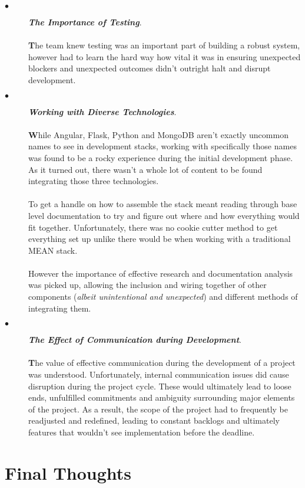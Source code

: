 \begin{description}
  \item[$\bullet$] \textit{\textbf{The Importance of Testing}}.
  
  \paragraph{}
  \textbf{T}he team knew testing was an important part of building a robust system, however had to learn the hard way how vital it was in ensuring unexpected blockers and unexpected outcomes didn't outright halt and disrupt development.
  
  \item[$\bullet$] \textit{\textbf{Working with Diverse Technologies}}.
  
  \paragraph{}
  \textbf{W}hile Angular, Flask, Python and MongoDB aren't exactly uncommon names to see in development stacks, working with specifically those names was found to be a rocky experience during the initial development phase. As it turned out, there wasn't a whole lot of content to be found integrating those three technologies.
  
  \paragraph{}
  To get a handle on how to assemble the stack meant reading through base level documentation to try and figure out where and how everything would fit together. Unfortunately, there was no cookie cutter method to get everything set up unlike there would be when working with a traditional MEAN stack. 
  
  \paragraph{}
  However the importance of effective research and documentation analysis was picked up, allowing the inclusion and wiring together of other components (\textit{albeit unintentional and unexpected}) and different methods of integrating them.

  \item[$\bullet$] \textit{\textbf{The Effect of Communication during Development}}.
  
  \paragraph{}
  \textbf{T}he value of effective communication during the development of a project was understood. Unfortunately, internal communication issues did cause disruption during the project cycle. These would ultimately lead to loose ends, unfulfilled commitments and ambiguity surrounding major elements of the project. As a result, the scope of the project had to frequently be readjusted and redefined, leading to constant backlogs and ultimately features that wouldn't see implementation before the deadline.
  
\end{description}

\section{Final Thoughts}